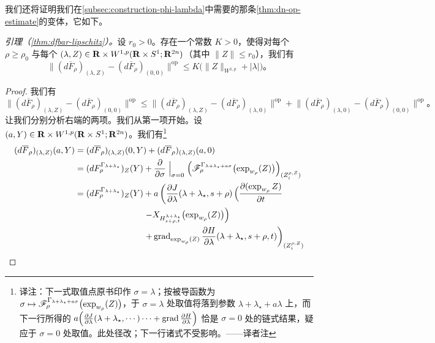 我们还将证明我们在\cref{subsec:construction-phi-lambda}中需要的那条\cref{thm:dn-op-estimate}的变体，它如下。

\emph{引理（\cref{thm:dfbar-lipschitz}）。}设 $r_{0}>0$。存在一个常数 $K>0$，使得对每个 $\rho\ge\rho_{0}$ 与每个 $(\lambda,Z)\in\mathbf{R}\times W^{1,p}(\mathbf{R}\times S^{1};\mathbf{R}^{2n})$（其中 $\|Z\|\le r_{0}$），我们有
\[
\bigl\|(d\overline{F}_{\rho})_{(\lambda,Z)}-(d\overline{F}_{\rho})_{(0,0)}\bigr\|^{\mathrm{op}}\le K\bigl(\|Z\|_{W^{1,p}}+|\lambda|\bigr)\text{。}
\]

\begin{proof}
我们有
\[
\bigl\|(d\overline{F}_{\rho})_{(\lambda,Z)}-(d\overline{F}_{\rho})_{(0,0)}\bigr\|^{\mathrm{op}}\le\bigl\|(d\overline{F}_{\rho})_{(\lambda,Z)}-(d\overline{F}_{\rho})_{(\lambda,0)}\bigr\|^{\mathrm{op}}+\bigl\|(d\overline{F}_{\rho})_{(\lambda,0)}-(d\overline{F}_{\rho})_{(0,0)}\bigr\|^{\mathrm{op}}\text{。}
\]
让我们分别分析右端的两项。我们从第一项开始。设 $(a,Y)\in\mathbf{R}\times W^{1,p}(\mathbf{R}\times S^{1};\mathbf{R}^{2n})$。我们有\footnote{译注：下一式取值点原书印作 $\sigma=\lambda$；按被导函数为 $\sigma\mapsto\mathscr{F}_{\rho}^{\Gamma_{\lambda+\lambda_{\star}+a\sigma}}\bigl(\exp_{w_{\rho}}(Z)\bigr)$，于 $\sigma=\lambda$ 处取值将落到参数 $\lambda+\lambda_{\star}+a\lambda$ 上，而下一行所得的 $a\Bigl(\frac{\partial J}{\partial\lambda}(\lambda+\lambda_{\star},\cdots)\cdots+\operatorname{grad}\frac{\partial H}{\partial\lambda}\Bigr)$ 恰是 $\sigma=0$ 处的链式结果，疑应于 $\sigma=0$ 处取值。此处径改；下一行诸式不受影响。——译者注}
\[
\begin{aligned}
(d\overline{F}_{\rho})_{(\lambda,Z)}(a,Y)&=(d\overline{F}_{\rho})_{(\lambda,Z)}(0,Y)+(d\overline{F}_{\rho})_{(\lambda,Z)}(a,0)\\
&=(dF_{\rho}^{\Gamma_{\lambda+\lambda_{\star}}})_{Z}(Y)+\frac{\partial}{\partial\sigma}\Bigm|_{\sigma=0}\Bigl(\mathscr{F}_{\rho}^{\Gamma_{\lambda+\lambda_{\star}+a\sigma}}\bigl(\exp_{w_{\rho}}(Z)\bigr)\Bigr)_{(Z_{i}^{\rho,Z})}\\
&=(dF_{\rho}^{\Gamma_{\lambda+\lambda_{\star}}})_{Z}(Y)+a\left(\frac{\partial J}{\partial\lambda}(\lambda+\lambda_{\star},s+\rho)\,\Bigl(\frac{\partial(\exp_{w_{\rho}}Z)}{\partial t}\right.\\
&\qquad\qquad\qquad\qquad\left.-X_{H_{s+\rho,t}^{\lambda+\lambda_{\star}}}\bigl(\exp_{w_{\rho}}(Z)\bigr)\Bigr)\right.\\
&\qquad\qquad\qquad\qquad\left.+\operatorname{grad}_{\exp_{w_{\rho}}(Z)}\frac{\partial H}{\partial\lambda}(\lambda+\lambda_{\star},s+\rho,t)\right)_{(Z_{i}^{\rho,Z})}
\end{aligned}
\]
\end{proof}
